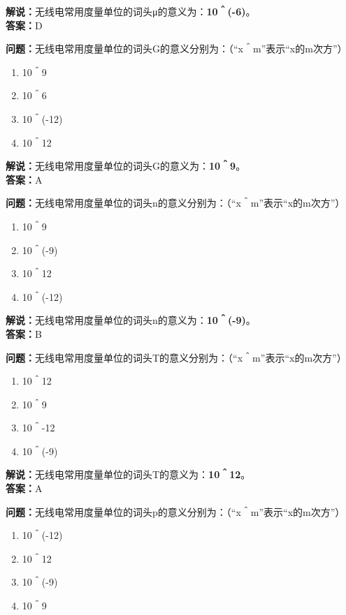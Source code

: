\textbf{解说：}无线电常用度量单位的词头μ的意义为：\textbf{10＾(-6)}。\\\textbf{答案：}D



\textbf{问题：}无线电常用度量单位的词头G的意义分别为：（“x＾m”表示“x的m次方”）

\begin{enumerate}[label=\Alph*), leftmargin=1cm]
	\item 10＾9
	\item 10＾6
	\item 10＾(-12)
	\item 10＾12
\end{enumerate}

\textbf{解说：}无线电常用度量单位的词头G的意义为：\textbf{10＾9}。\\\textbf{答案：}A



\textbf{问题：}无线电常用度量单位的词头n的意义分别为：（“x＾m”表示“x的m次方”）

\begin{enumerate}[label=\Alph*), leftmargin=1cm]
	\item 10＾9
	\item 10＾(-9)
	\item 10＾12
	\item 10＾(-12)
\end{enumerate}

\textbf{解说：}无线电常用度量单位的词头n的意义为：\textbf{10＾(-9)}。\\\textbf{答案：}B



\textbf{问题：}无线电常用度量单位的词头T的意义分别为：（“x＾m”表示“x的m次方”）

\begin{enumerate}[label=\Alph*), leftmargin=1cm]
	\item 10＾12
	\item 10＾9
	\item 10＾-12
	\item 10＾(-9)
\end{enumerate}

\textbf{解说：}无线电常用度量单位的词头T的意义为：\textbf{10＾12}。\\\textbf{答案：}A



\textbf{问题：}无线电常用度量单位的词头p的意义分别为：（“x＾m”表示“x的m次方”）

\begin{enumerate}[label=\Alph*), leftmargin=1cm]
	\item 10＾(-12)
	\item 10＾12
	\item 10＾(-9)
	\item 10＾9
\end{enumerate}

